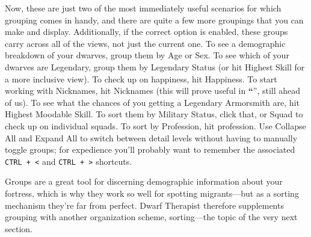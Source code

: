 \documentclass[]{article}
\newcommand{\jump}[1] {\textbf{``\nameref{sec:#1}}''}
\begin{document}
Now, these are just two of the most immediately useful scenarios for which grouping comes in handy, and
there are quite a few more groupings that you can make and display. Additionally, if the correct option
is enabled, these groups carry across all of the views, not just the current one. To see a
demographic breakdown of your dwarves, group them by Age or Sex. To see which of your dwarves are
Legendary, group them by Legendary Status (or hit Highest Skill for a more inclusive view). To check up
on happiness, hit Happiness. To start working with Nicknames, hit Nicknames (this will prove useful in
\jump{Assigning Nicknames}, still ahead of us). To see what the chances of you
getting a Legendary Armorsmith are, hit Highest Moodable Skill. To sort them by Military Status, click
that, or Squad to check up on individual squads. To sort by Profession, hit profession.
Use Collapse All and Expand All to switch between detail levels without having to manually toggle groups;
for expedience you'll probably want to remember the associated \texttt{CTRL + <} and \texttt{CTRL + >}
shortcuts.

Groups are a great tool for discerning demographic information about your fortress, which is why they
work so well for spotting migrants---but as a sorting mechanism they're far from perfect. Dwarf
Therapist therefore supplements grouping with another organization scheme, sorting---the topic of the
very next section.

\newpage
\end{document}
